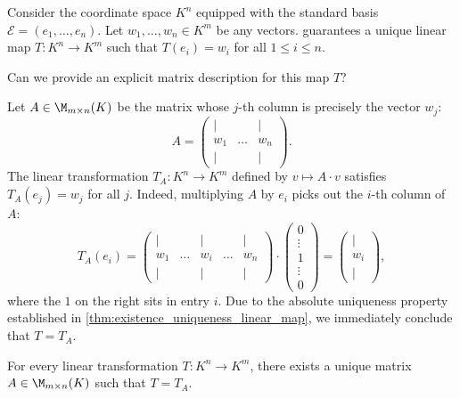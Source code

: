 \begin{example}
\label{ex:linear_map_std_basis}
Consider the coordinate space $K^n$ equipped with the standard basis $\mathcal{E} = (e_1, \dots, e_n)$. Let $w_1, \dots, w_n \in K^m$ be any vectors.  guarantees a unique linear map $T: K^n \to K^m$ such that $T(e_i) = w_i$ for all $1 \le i \le n$.

\begin{question}
Can we provide an explicit matrix description for this map $T$?
\end{question}

\begin{answer}
Let $A \in \M_{m \times n}(K)$ be the matrix whose $j$-th column is precisely the vector $w_j$:
\[
A = 
\begin{pmatrix}
| & & | \\
w_1 & \dots & w_n \\
| & & |
\end{pmatrix}.
\]
The linear transformation $T_A: K^n \to K^m$ defined by $v \mapsto A \cdot v$ satisfies $T_A(e_j) = w_j$ for all $j$.
Indeed, multiplying $A$ by $e_i$ picks out the $i$-th column of $A$:
\[
T_A(e_i) = \begin{pmatrix} | & & | & & | \\ w_1 & \dots & w_i & \dots & w_n \\ | & & | & & | \end{pmatrix} \cdot \begin{pmatrix} 0 \\ \vdots \\ 1 \\ \vdots \\ 0 \end{pmatrix} = \begin{pmatrix} | \\ w_i \\ | \end{pmatrix},
\]
where the $1$ on the right sits in entry $i$.
Due to the absolute uniqueness property established in \cref{thm:existence_uniqueness_linear_map}, we immediately conclude that $T = T_A$.
\end{answer}
\end{example}

\begin{lemma}
\label{lem:all_linear_maps_are_matrices}
For every linear transformation $T: K^n \to K^m$, there exists a unique matrix $A \in \M_{m \times n}(K)$ such that $T = T_A$.
\end{lemma}

